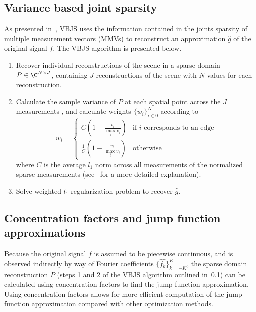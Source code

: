 \documentclass{article}
\begin{document}

\subsection{Variance based joint sparsity}\label{subsec:vbjs}

As presented in~\cite{gelb_2018}, VBJS uses the information contained in the joints sparsity of multiple measurement vectors (MMVs) to reconstruct an approximation $\hat{g}$ of the original signal $f$. The VBJS algorithm is presented below.

\begin{enumerate}
    \item Recover individual reconstructions of the scene in a sparse domain $P \in \C^{N\times J}$, containing $J$ reconstructions of the scene with $N$ values for each reconstruction.
    \item Calculate the sample variance of $P$ at each spatial point across the $J$ measurements%
    , and calculate weights $\{w_i\}_{i \in 0}^N$ according to
    \begin{equation}
        w_i = \begin{cases}
            C(1-\frac{v_i}{\max_i v_i}) & \text{if $i$ corresponds to an edge} \\
            \frac{1}{C}(1-\frac{v_i}{\max_i v_i}) & \text{otherwise}
    \end{cases}
    \end{equation}
    where $C$ is the average $l_1$ norm across all measurements of the normalized sparse measurements (see~\cite{gelb_2018} for a more detailed explanation).
    \item Solve weighted $l_1$ regularization problem to recover $\hat{g}$.
\end{enumerate}

\subsection{Concentration factors and jump function approximations}

Because the original signal $f$ is assumed to be piecewise continuous, and is observed indirectly by way of Fourier coefficients $\{\hat{f_k}\}_{k=-K}^K$, the sparse domain reconstruction $P$ (steps 1 and 2 of the VBJS algorithm outlined in~\ref{subsec:vbjs}) can be calculated using concentration factors to find the jump function approximation. Using concentration factors allows for more efficient computation of the jump function approximation compared with other optimization methods.
\end{document}
